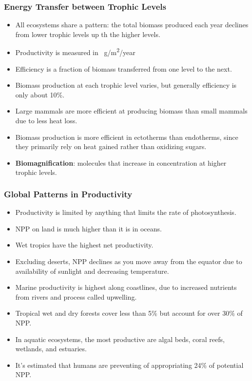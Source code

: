 \documentclass[12pt,a4paper]{article}
\begin{document}
    \subsubsection{Energy Transfer between Trophic Levels}
    \begin{itemize}
        \item All ecosystems share a pattern: the total biomass produced each year declines from lower trophic levels up th the higher levels.
        \item Productivity is measured in \SI{}{g/m^2/year} 
        \item Efficiency is a fraction of biomass transferred from one level to the next.
        \item Biomass production at each trophic level varies, but generally efficiency is only about 10\%.
        \item Large mammals are more efficient at producing biomass than small mammals due to less heat loss.
        \item Biomass production is more efficient in ectotherms than endotherms, since they primarily rely on heat gained rather than oxidizing sugars.
        \item \textbf{Biomagnification}: molecules that increase in concentration at higher trophic levels.
    \end{itemize}
    \subsubsection{Global Patterns in Productivity}
    \begin{itemize}
        \item Productivity is limited by anything that limits the rate of photosynthesis.
        \item NPP on land is much higher than it is in oceans.
        \item Wet tropics have the highest net productivity.
        \item Excluding deserts, NPP declines as you move away from the equator due to availability of sunlight and decreasing temperature.
        \item Marine productivity is highest along coastlines, due to increased nutrients from rivers and process called upwelling.
        \item Tropical wet and dry forests cover less than 5\% but account for over 30\% of NPP.
        \item In aquatic ecosystems, the most productive are algal beds, coral reefs, wetlands, and estuaries.
        \item It's estimated that humans are preventing of appropriating 24\% of potential NPP.
    \end{itemize}
\end{document}
